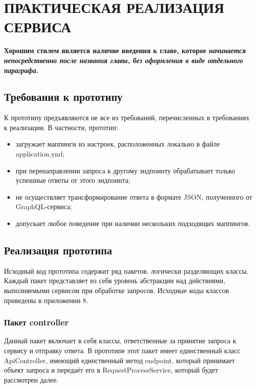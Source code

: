 \chapter{ПРАКТИЧЕСКАЯ РЕАЛИЗАЦИЯ СЕРВИСА}\label{ch:ch3}

\textbf{Хорошим стилем является наличие введения к главе, которое \textit{начинается непосредственно после названия главы, без оформления в виде отдельного параграфа}.}

\section{Требования к прототипу}\label{ch3:sec1}

К прототипу предъявляются не все из требований, перечисленных в требованиях к реализации.
В частности, прототип:

\begin{itemize}
	\item загружает маппинги из настроек, расположенных локально в файле application.yml;
	\item при перенаправлении запроса к другому эндпоинту обрабатывает только успешные ответы от этого эндпоинта;
	\item не осуществляет трансформирование ответа в формате JSON, полученного от GraphQL-сервиса;
	\item допускает любое поведение при наличии нескольких подходящих маппингов.
\end{itemize}

\section{Реализация прототипа}\label{ch3:sec2}

Исходный код прототипа содержит ряд пакетов, логически разделяющих классы.
Каждый пакет представляет из себя уровень абстракции над действиями, выполняемыми сервисом при обработке запросов.
Исходные коды классов приведены в приложении 8.

\subsection{Пакет controller}

Данный пакет включает в себя классы, ответственные за принятие запроса к сервису и отправку ответа.
В прототипе этот пакет имеет единственный класс ApiController, имеющий единственный метод endpoint, который принимает объект запроса и передаёт его в RequestProcessService, который будет рассмотрен далее.

